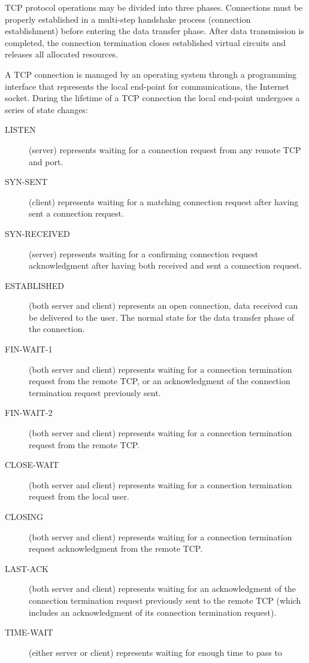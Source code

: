  TCP protocol operations may be divided
into three phases. Connections must be properly established in a multi-step handshake
process (connection establishment) before entering the data transfer phase. After data
transmission is completed, the connection termination closes established virtual circuits
and releases all allocated resources.

A TCP connection is managed by an operating system through a programming interface that
represents the local end-point for communications, the Internet socket. During the
lifetime of a TCP connection the local end-point undergoes a series of state
changes:

\begin{description}
\item[LISTEN] (server) represents waiting for a connection request from any remote TCP and
  port.
\item[SYN-SENT] (client) represents waiting for a matching connection request after having
  sent a connection request.
\item[SYN-RECEIVED] (server) represents waiting for a confirming connection request
  acknowledgment after having both received and sent a connection request.
\item[ESTABLISHED] (both server and client) represents an open connection, data received
  can be delivered to the user. The normal state for the data transfer phase of the
  connection.
\item[FIN-WAIT-1] (both server and client) represents waiting for a connection termination
  request from the remote TCP, or an acknowledgment of the connection termination request
  previously sent.
\item[FIN-WAIT-2] (both server and client) represents waiting for a connection termination
  request from the remote TCP.
\item[CLOSE-WAIT] (both server and client) represents waiting for a connection termination
  request from the local user.
\item[CLOSING] (both server and client) represents waiting for a connection termination
  request acknowledgment from the remote TCP.
\item[LAST-ACK] (both server and client) represents waiting for an acknowledgment of the
  connection termination request previously sent to the remote TCP (which includes an
  acknowledgment of its connection termination request).
\item[TIME-WAIT] (either server or client) represents waiting for enough time to pass to

\end{description}
